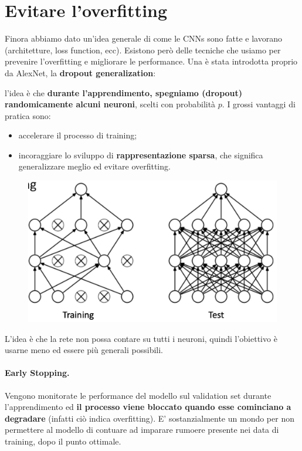 \section{Evitare l'overfitting}
Finora abbiamo dato un'idea generale di come le CNNs sono fatte e lavorano (architetture, loss function, ecc). Esistono però delle tecniche che usiamo per prevenire l'overfitting e migliorare le performance. Una è stata introdotta proprio da AlexNet, la \textbf{dropout generalization}:


l'idea è che \textbf{durante l'apprendimento, spegniamo (dropout) randomicamente alcuni neuroni}, scelti con probabilità $p$. I grossi vantaggi di pratica sono:
\begin{itemize}
    \item accelerare il processo di training;
    \item incoraggiare lo sviluppo di \textbf{rappresentazione sparsa}, che significa generalizzare meglio ed evitare overfitting.
\end{itemize}
\begin{figure}[!h]
    \includegraphics[scale=.5]{images/cnn/dropout.png}
    \centering
\end{figure}
L'idea è che la rete non possa contare su tutti i neuroni, quindi l'obiettivo è usarne meno ed essere più generali possibili.

\paragraph{Early Stopping.} Vengono monitorate le performance del modello sul validation set durante l'apprendimento ed \textbf{il processo viene bloccato quando esse cominciano a degradare} (infatti ciò indica overfitting). E' sostanzialmente un mondo per non permettere al modello di contuare ad imparare rumoere presente nei data di training, dopo il punto ottimale.

